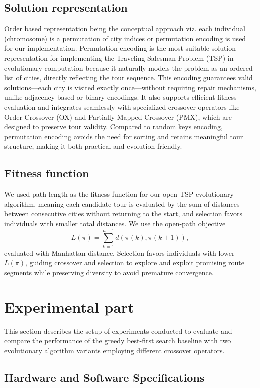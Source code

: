\documentclass{scrartcl}
\begin{document}
\subsection{Solution representation }
Order based representation being the conceptual approach viz. each individual (chromosome) is a permutation of city indices or permutation encoding is used for our implementation. Permutation encoding is the most suitable solution representation for implementing the Traveling Salesman Problem (TSP) in evolutionary computation because it naturally models the problem as an ordered list of cities, directly reflecting the tour sequence. This encoding guarantees valid solutions—each city is visited exactly once—without requiring repair mechanisms, unlike adjacency-based or binary encodings. It also supports efficient fitness evaluation and integrates seamlessly with specialized crossover operators like Order Crossover (OX) and Partially Mapped Crossover (PMX), which are designed to preserve tour validity. Compared to random keys encoding, permutation encoding avoids the need for sorting and retains meaningful tour structure, making it both practical and evolution-friendly.


\subsection{Fitness function }

We used path length as the fitness function for our open TSP evolutionary algorithm, meaning each candidate tour is evaluated by the sum of distances between consecutive cities without returning to the start, and selection favors individuals with smaller total distances.
We use the open-path objective
\[
L(\pi)=\sum_{k=1}^{n-1} d(\pi(k),\pi(k+1)),
\]
evaluated with Manhattan distance. Selection favors individuals with lower \(L(\pi)\),  guiding crossover and selection to explore and exploit promising route segments while preserving diversity to avoid premature convergence.


\section{Experimental part}
\label{sec:experimentation}

This section describes the setup of experiments conducted to evaluate and compare the performance of the greedy best-first search baseline with two evolutionary algorithm variants employing different crossover operators.

\subsection{Hardware and Software Specifications}
\end{document}
